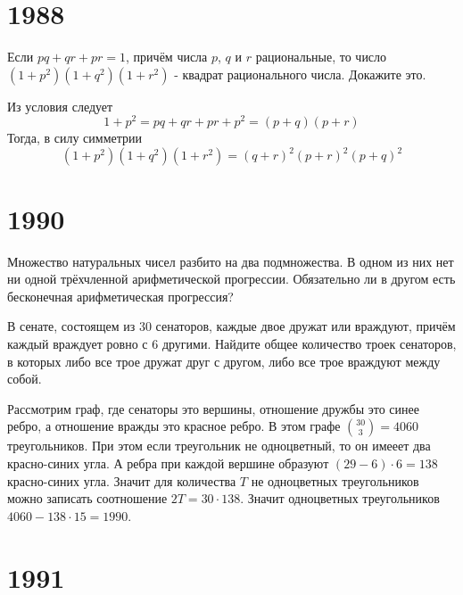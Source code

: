 \documentclass[11pt, a4paper]{problems_template}
\begin{document}
\chapter{1988}

\begin{exercise}[1088]
Если $pq + qr + pr = 1$, причём числа $p$, $q$ и $r$ рациональные, то число $(1 + p^{2})(1 + q^{2})(1 + r^{2})$ - квадрат рационального числа. Докажите это.
\end{exercise}

\begin{Solution}
Из условия следует
$$
1 + p^{2} = pq + qr + pr + p^{2} = (p + q)(p + r)
$$
Тогда, в силу симметрии
$$
(1 + p^{2})(1 + q^{2})(1 + r^{2}) = (q + r)^{2}(p + r)^{2}(p + q)^{2}
$$
\end{Solution}

\chapter{1990}

\begin{exercise}[1238]
Множество натуральных чисел разбито на два подмножества. В одном из них нет ни одной трёхчленной арифметической прогрессии. Обязательно ли в другом есть бесконечная арифметическая прогрессия?
\end{exercise}

\begin{exercise}[1244]
В сенате, состоящем из 30 сенаторов, каждые двое дружат или враждуют, причём каждый враждует ровно с 6 другими. Найдите общее количество троек сенаторов, в которых либо все трое дружат друг с другом, либо все трое враждуют между собой.
\end{exercise}

\begin{Solution}
Рассмотрим граф, где сенаторы это вершины, отношение дружбы это синее ребро, а отношение вражды это красное ребро. В этом графе $\binom{30}{3} = 4060$ треугольников. При этом если треугольник не одноцветный, то он имееет два красно-синих угла. А ребра при каждой вершине образуют $(29 - 6) \cdot 6 = 138$ красно-синих угла. Значит для количества $T$ не одноцветных треугольников можно записать соотношение $2 T = 30 \cdot 138$. Значит одноцветных треугольников $4060 - 138 \cdot 15 = 1990$.
\end{Solution}

\chapter{1991}
\end{document}
